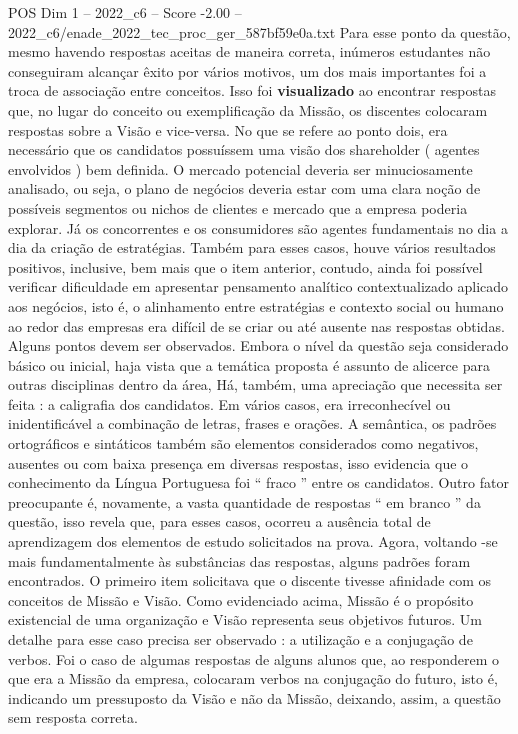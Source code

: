 \begin{textsample}{POS Dim 1 – 2022\_c6 – Score -2.00 – 2022\_c6/enade\_2022\_tec\_proc\_ger\_587bf59e0a.txt}
Para esse ponto da questão, mesmo havendo respostas aceitas de maneira correta, inúmeros estudantes não conseguiram alcançar êxito por vários motivos, um dos mais importantes foi a troca de associação entre conceitos.
Isso foi \textbf{visualizado} ao encontrar respostas que, no lugar do conceito ou exemplificação da Missão, os discentes colocaram respostas sobre a Visão e vice-versa.
No que se refere ao ponto dois, era necessário que os candidatos possuíssem uma visão dos shareholder ( agentes envolvidos ) bem definida.
O mercado potencial deveria ser minuciosamente analisado, ou seja, o plano de negócios deveria estar com uma clara noção de possíveis segmentos ou nichos de clientes e mercado que a empresa poderia explorar.
Já os concorrentes e os consumidores são agentes fundamentais no dia a dia da criação de estratégias.
Também para esses casos, houve vários resultados positivos, inclusive, bem mais que o item anterior, contudo, ainda foi possível verificar dificuldade em apresentar pensamento analítico contextualizado aplicado aos negócios, isto é, o alinhamento entre estratégias e contexto social ou humano ao redor das empresas era difícil de se criar ou até ausente nas respostas obtidas.
Alguns pontos devem ser observados.
Embora o nível da questão seja considerado básico ou inicial, haja vista que a temática proposta é assunto de alicerce para outras disciplinas dentro da área, Há, também, uma apreciação que necessita ser feita : a caligrafia dos candidatos.
Em vários casos, era irreconhecível ou inidentificável a combinação de letras, frases e orações.
A semântica, os padrões ortográficos e sintáticos também são elementos considerados como negativos, ausentes ou com baixa presença em diversas respostas, isso evidencia que o conhecimento da Língua Portuguesa foi “ fraco ” entre os candidatos.
Outro fator preocupante é, novamente, a vasta quantidade de respostas “ em branco ” da questão, isso revela que, para esses casos, ocorreu a ausência total de aprendizagem dos elementos de estudo solicitados na prova.
Agora, voltando -se mais fundamentalmente às substâncias das respostas, alguns padrões foram encontrados.
O primeiro item solicitava que o discente tivesse afinidade com os conceitos de Missão e Visão.
Como evidenciado acima, Missão é o propósito existencial de uma organização e Visão representa seus objetivos futuros.
Um detalhe para esse caso precisa ser observado : a utilização e a conjugação de verbos.
Foi o caso de algumas respostas de alguns alunos que, ao responderem o que era a Missão da empresa, colocaram verbos na conjugação do futuro, isto é, indicando um pressuposto da Visão e não da Missão, deixando, assim, a questão sem resposta correta.

\end{textsample}
